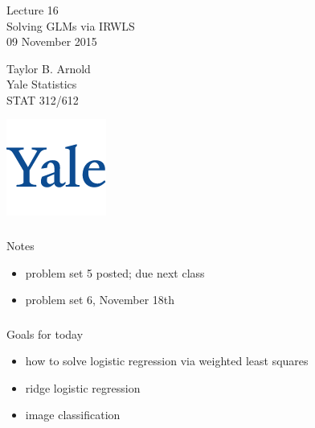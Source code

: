 



\begin{frame}[fragile] \frametitle{}

\vfill

{\fontsize{0.7cm}{0cm}\selectfont Lecture 16 \\\vspace{0.2cm}
Solving GLMs via IRWLS}\\\vspace{0.5cm}
09 November 2015

\vspace{2cm}

\begin{minipage}{0.6\textwidth}
Taylor B. Arnold \\
Yale Statistics \\
STAT 312/612
\end{minipage}
\hfill
\begin{minipage}{0.3\textwidth}\raggedleft
\includegraphics[scale=0.3]{../yale-logo.png}
\end{minipage}%

\end{frame}

\begin{frame}[fragile] \frametitle{}

{\color{yaleblue}\fontsize{16pt}{20pt}\selectfont Notes}

\begin{itemize}
\item problem set 5 posted; due next class \pause
\item problem set 6, November 18th
\end{itemize}

\end{frame}

\begin{frame}[fragile] \frametitle{}

{\color{yaleblue}\fontsize{16pt}{20pt}\selectfont Goals for today}

\begin{itemize}
\item how to solve logistic regression via weighted least squares
\item ridge logistic regression
\item image classification
\end{itemize}

\end{frame}

